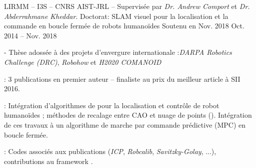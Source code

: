 
\begin{cventries}

  \cventry
  {LIRMM -- I3S -- CNRS AIST-JRL -- Supervisée par \emph{Dr. Andrew Comport} et \emph{Dr. Abderrahmane
  Kheddar}.} %
  {Doctorat: SLAM visuel pour la localisation et la commande en boucle fermée de robots humanoïdes} %
  {Soutenu en Nov. 2018} %
  {Oct. 2014 -- Nov. 2018} %
  {
    \begin{cvitems} %
    \item {} - Thèse adossée à des projets d'envergure internationale
      :\emph{DARPA Robotics Challenge (DRC)}, \emph{Robohow} et \emph{H2020 COMANOID}
    \item {}: 3 publications en premier auteur -- finaliste au prix du meilleur
      article à SII 2016.
    \item {}: Intégration d'algorithmes de  pour la
      localisation et contrôle de
      robot humanoïdes ; méthodes de recalage entre CAO et nuage de points (). Intégration de
      ces travaux à un algorithme de marche par commande prédictive (MPC) en boucle fermée.
    \item {} : Codes associés aux publications (\emph{ICP},
      \emph{Robcalib}, \emph{Savitzky-Golay}, ...), contributions au framework .
    \end{cvitems}
  }



\end{cventries}
